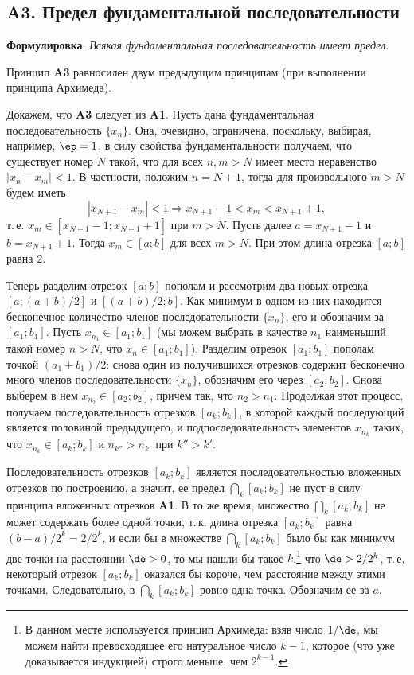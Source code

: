 \begin{enumerate}
\subsection*{A3. Предел фундаментальной последовательности}

\noindent
\textbf{Формулировка}: \textit{Всякая фундаментальная последовательность имеет предел}.

\begin{thrm} Принцип \textbf{A3} равносилен двум предыдущим принципам (при выполнении принципа Архимеда).\end{thrm}
\pf
Докажем, что \textbf{A3} следует из \textbf{A1}. Пусть дана фундаментальная последовательность $\{x_n\}$. Она, очевидно, ограничена, поскольку, выбирая, например, $\ep=1$, в силу свойства фундаментальности получаем, что существует номер $N$ такой, что для всех $n,m>N$ имеет место неравенство $|x_n-x_m|<1$. В частности, положим $n=N+1$, тогда для произвольного $m>N$ будем иметь
$$
|x_{N+1}-x_m|<1\Rightarrow x_{N+1}-1<x_m<x_{N+1}+1,
$$
т.\,е. $x_m\in [x_{N+1}-1;x_{N+1}+1]$ при $m>N$. Пусть далее $a=x_{N+1}-1$ и 
$b=x_{N+1}+1$. Тогда $x_m\in[a;b]$ для всех $m>N$. При этом длина отрезка $[a;b]$ равна $2$.

Теперь разделим отрезок $[a;b]$ пополам и рассмотрим два новых отрезка $[a;(a+b)/2]$ и $[(a+b)/2;b]$. Как минимум в одном из них находится бесконечное количество членов последовательности $\{x_n\}$, его и обозначим за $[a_1;b_1]$.
Пусть $x_{n_1}\in[a_1;b_1]$ (мы можем выбрать в качестве $n_1$ наименьший такой номер $n>N$, что $x_n\in[a_1;b_1]$). Разделим отрезок $[a_1;b_1]$ пополам точкой $(a_1+b_1)/2$: снова один из получившихся отрезков содержит бесконечно много членов последовательности $\{x_n\}$, обозначим его через $[a_2;b_2]$. Снова выберем в нем $x_{n_2}\in[a_2;b_2]$, причем так, что $n_2>n_1$. Продолжая этот процесс, получаем последовательность отрезков $[a_k;b_k]$, в которой каждый последующий является половиной предыдущего, и подпоследовательность элементов $x_{n_k}$ таких, что $x_{n_k}\in[a_k;b_k]$ и $n_{k''}>n_{k'}$ при $k''>k'$.

Последовательность отрезков $[a_k;b_k]$ является последовательностью вложенных отрезков по построению, а значит, ее предел $\bigcap_k[a_k;b_k]$ не пуст в силу принципа вложенных отрезков \textbf{A1}. В то же время, множество $\bigcap_k[a_k;b_k]$ не может содержать более одной точки, т.\,к. длина отрезка $[a_k;b_k]$ равна $(b-a)/2^k=2/2^k$, и если бы в множестве $\bigcap_k[a_k;b_k]$ было бы как минимум две точки на расстоянии $\de>0$, то мы нашли бы такое $k$,\footnote{В данном месте используется принцип Архимеда: взяв число $1/\de$, мы можем найти превосходящее его натуральное число $k-1$, которое (что уже доказывается индукцией) строго меньше, чем $2^{k-1}$.} что $\de>2/2^k$, т.\,е. некоторый отрезок $[a_k;b_k]$ оказался бы короче, чем расстояние между этими точками. Следовательно, в $\bigcap_k[a_k;b_k]$ ровно одна точка. Обозначим ее за $a$.


\end{enumerate}
